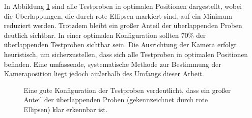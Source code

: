     In Abbildung \ref{fig:methodik:rightPosition} sind alle Testproben in optimalen Positionen dargestellt, wobei die Überlappungen, die durch rote Ellipsen markiert sind, auf ein Minimum reduziert werden. Trotzdem bleibt ein großer Anteil der überlappenden Proben deutlich sichtbar. In einer optimalen Konfiguration sollten 70\% der überlappenden Testproben sichtbar sein. Die Ausrichtung der Kamera erfolgt heuristisch, um sicherzustellen, dass sich alle Testproben in optimalen Positionen befinden. Eine umfassende, systematische Methode zur Bestimmung der Kameraposition liegt jedoch außerhalb des Umfangs dieser Arbeit.
    
    \begin{figure}[htbp]
        \centering
            
            \caption[Gute Positionen der Testproben.]{Eine gute Konfiguration der Testproben verdeutlicht, dass ein großer Anteil der überlappenden Proben (gekennzeichnet durch rote Ellipsen) klar erkennbar ist.}
            \label{fig:methodik:rightPosition}
    \end{figure}

